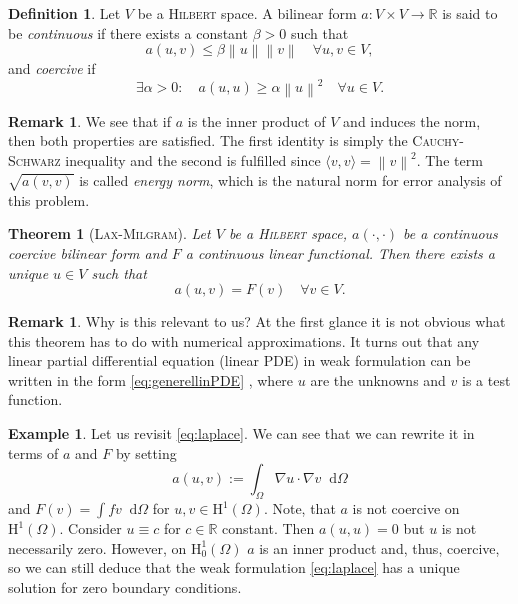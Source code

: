 \documentclass[12pt,a4paper,twoside, open=right]{scrreprt}
\theoremstyle{definition}
\newtheorem{rem}[auf]{Remark}
\newtheorem{defn}[auf]{Definition}
\newtheorem{bsp}[auf]{Example}
\theoremstyle{plain}
\newtheorem{sa}[auf]{Theorem}
\newcommand{\rr}{\mathbb{R}}
\newcommand{\norm}[1]{\left\lVert#1\right\rVert}
\newcommand{\D}{\mathop{}\!\mathrm{d}}
\begin{document}
\begin{defn}
    Let $V$ be a \textsc{Hilbert} space. A bilinear form  $a\colon V\times V\to\rr$ is said to be \emph{continuous} if there exists a constant $\beta>0$ such that
    \begin{equation}
        a(u,v)\le\beta\norm{u}\norm{v}\quad \forall u,v\in V,
    \end{equation}
    and \emph{coercive} if 
    \begin{equation}
        \exists\alpha>0\colon \quad a(u,u)\ge \alpha\norm{u}^2\quad\forall u\in V.
    \end{equation}
\end{defn}
\begin{rem}
    We see that if $a$ is the inner product of $V$ and induces the norm, then both properties are satisfied. The first identity is simply the \textsc{Cauchy-Schwarz} inequality and the second is fulfilled since $\langle v,v\rangle=\norm{v}^2$. The term $\sqrt{a(v,v)}$ is called \emph{energy norm}, which is the natural norm for error analysis of this problem.
\end{rem}
\begin{sa}[\textsc{Lax-Milgram}]
    \label{sa:LaxMilgram}
    Let $V$ be a \textsc{Hilbert} space, $a(\cdot,\cdot)$ be a continuous coercive bilinear form and $F$ a continuous linear functional. Then there exists a unique $u\in V$ such that
    \begin{equation}
        a(u,v)=F(v)\quad \forall v\in V.\label{eq:generellinPDE}
    \end{equation}
\end{sa}
\begin{rem}
    Why is this relevant to us? At the first glance it is not obvious what this theorem has to do with numerical approximations. It turns out that any linear partial differential equation (linear PDE) in weak formulation can be written in the form \eqref{eq:generellinPDE} , where $u$ are the unknowns and $v$ is a test function.
\end{rem}
\begin{bsp}
    Let us revisit \eqref{eq:laplace}. We can see that we can rewrite it in terms of $a$ and $F$ by setting 
    \begin{equation}
        a(u,v):=\int_\Omega \nabla u\cdot \nabla v\D\Omega
    \end{equation}
    and $F(v)=\int fv\D\Omega$ for $u,v\in \mathrm{H}^1(\Omega)$. Note, that $a$ is not coercive on $\mathrm{H}^1(\Omega)$. Consider $u\equiv c$ for $c\in\rr$ constant. Then $a(u,u)=0$ but $u$ is not necessarily zero. However, on $\mathrm{H}^1_0(\Omega)$ $a$ is an inner product and, thus, coercive, so we can still deduce that the weak formulation \eqref{eq:laplace} has a unique solution for zero boundary conditions.
\end{bsp}
\end{document}
